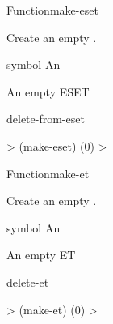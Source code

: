 \documentclass[10pt,twoside,english,pdftex]{article}
\begin{document}
\begin{functiondoc}{Function}{make-eset}{\noargs
    }
%
%
  
\fnsyntax

\fnpurpose Create an empty .

\fnpackage {}

\fnmodule {}

\fnargs
\begin{args}{symbol}
\arg[eset] An 
\end{args}

\fnreturns An empty ESET

\begin{alsos}{delete-from-eset}
\also[in-eset]
\end{alsos}

\fnexamples
%
\W\supp
\begin{example}
  > (make-eset)
  (0)
  > 
\end{example}

\end{functiondoc}


\begin{functiondoc}{Function}{make-et}{\noargs
    }
%
%
  
\fnsyntax

\fnpurpose Create an empty .

\fnpackage {}

\fnmodule {}

\fnargs
\begin{args}{symbol}
\arg[et] An 
\end{args}

\fnreturns An empty ET

\begin{alsos}{delete-et}
\also[get-et]
\also[delete-et]
\end{alsos}

\fnexamples
%
\W\supp
\begin{example}
  > (make-et)
  (0)
  > 
\end{example}

\end{functiondoc}
\end{document}
